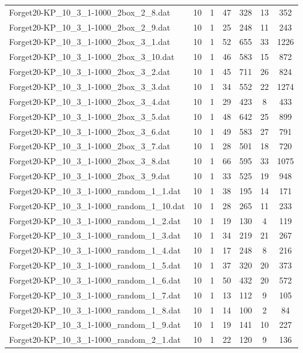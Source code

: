 \begin{table}[!ht]
\begin{tabular}{lcccccc}
Forget20-KP\_10\_3\_1-1000\_2box\_2\_8.dat & 10 & 1 & 47 & 328 & 13 & 352 \\
Forget20-KP\_10\_3\_1-1000\_2box\_2\_9.dat & 10 & 1 & 25 & 248 & 11 & 243 \\
Forget20-KP\_10\_3\_1-1000\_2box\_3\_1.dat & 10 & 1 & 52 & 655 & 33 & 1226 \\
Forget20-KP\_10\_3\_1-1000\_2box\_3\_10.dat & 10 & 1 & 46 & 583 & 15 & 872 \\
Forget20-KP\_10\_3\_1-1000\_2box\_3\_2.dat & 10 & 1 & 45 & 711 & 26 & 824 \\
Forget20-KP\_10\_3\_1-1000\_2box\_3\_3.dat & 10 & 1 & 34 & 552 & 22 & 1274 \\
Forget20-KP\_10\_3\_1-1000\_2box\_3\_4.dat & 10 & 1 & 29 & 423 & 8 & 433 \\
Forget20-KP\_10\_3\_1-1000\_2box\_3\_5.dat & 10 & 1 & 48 & 642 & 25 & 899 \\
Forget20-KP\_10\_3\_1-1000\_2box\_3\_6.dat & 10 & 1 & 49 & 583 & 27 & 791 \\
Forget20-KP\_10\_3\_1-1000\_2box\_3\_7.dat & 10 & 1 & 28 & 501 & 18 & 720 \\
Forget20-KP\_10\_3\_1-1000\_2box\_3\_8.dat & 10 & 1 & 66 & 595 & 33 & 1075 \\
Forget20-KP\_10\_3\_1-1000\_2box\_3\_9.dat & 10 & 1 & 33 & 525 & 19 & 948 \\
Forget20-KP\_10\_3\_1-1000\_random\_1\_1.dat & 10 & 1 & 38 & 195 & 14 & 171 \\
Forget20-KP\_10\_3\_1-1000\_random\_1\_10.dat & 10 & 1 & 28 & 265 & 11 & 233 \\
Forget20-KP\_10\_3\_1-1000\_random\_1\_2.dat & 10 & 1 & 19 & 130 & 4 & 119 \\
Forget20-KP\_10\_3\_1-1000\_random\_1\_3.dat & 10 & 1 & 34 & 219 & 21 & 267 \\
Forget20-KP\_10\_3\_1-1000\_random\_1\_4.dat & 10 & 1 & 17 & 248 & 8 & 216 \\
Forget20-KP\_10\_3\_1-1000\_random\_1\_5.dat & 10 & 1 & 37 & 320 & 20 & 373 \\
Forget20-KP\_10\_3\_1-1000\_random\_1\_6.dat & 10 & 1 & 50 & 432 & 20 & 572 \\
Forget20-KP\_10\_3\_1-1000\_random\_1\_7.dat & 10 & 1 & 13 & 112 & 9 & 105 \\
Forget20-KP\_10\_3\_1-1000\_random\_1\_8.dat & 10 & 1 & 14 & 100 & 2 & 84 \\
Forget20-KP\_10\_3\_1-1000\_random\_1\_9.dat & 10 & 1 & 19 & 141 & 10 & 227 \\
Forget20-KP\_10\_3\_1-1000\_random\_2\_1.dat & 10 & 1 & 22 & 120 & 9 & 136 \\

\end{tabular}
\end{table}
